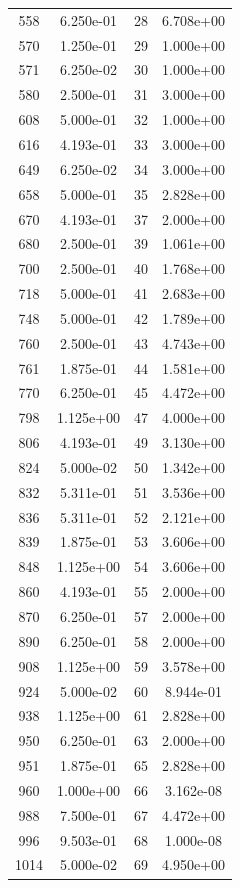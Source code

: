 \documentclass[12pt]{article}
\begin{document}
\begin{longtable}{@{}cccc@{}}
558 & 6.250e-01 & 28 & 6.708e+00 \\
570 & 1.250e-01 & 29 & 1.000e+00 \\
571 & 6.250e-02 & 30 & 1.000e+00 \\
580 & 2.500e-01 & 31 & 3.000e+00 \\
608 & 5.000e-01 & 32 & 1.000e+00 \\
616 & 4.193e-01 & 33 & 3.000e+00 \\
649 & 6.250e-02 & 34 & 3.000e+00 \\
658 & 5.000e-01 & 35 & 2.828e+00 \\
670 & 4.193e-01 & 37 & 2.000e+00 \\
680 & 2.500e-01 & 39 & 1.061e+00 \\
700 & 2.500e-01 & 40 & 1.768e+00 \\
718 & 5.000e-01 & 41 & 2.683e+00 \\
748 & 5.000e-01 & 42 & 1.789e+00 \\
760 & 2.500e-01 & 43 & 4.743e+00 \\
761 & 1.875e-01 & 44 & 1.581e+00 \\
770 & 6.250e-01 & 45 & 4.472e+00 \\
798 & 1.125e+00 & 47 & 4.000e+00 \\
806 & 4.193e-01 & 49 & 3.130e+00 \\
824 & 5.000e-02 & 50 & 1.342e+00 \\
832 & 5.311e-01 & 51 & 3.536e+00 \\
836 & 5.311e-01 & 52 & 2.121e+00 \\
839 & 1.875e-01 & 53 & 3.606e+00 \\
848 & 1.125e+00 & 54 & 3.606e+00 \\
860 & 4.193e-01 & 55 & 2.000e+00 \\
870 & 6.250e-01 & 57 & 2.000e+00 \\
890 & 6.250e-01 & 58 & 2.000e+00 \\
908 & 1.125e+00 & 59 & 3.578e+00 \\
924 & 5.000e-02 & 60 & 8.944e-01 \\
938 & 1.125e+00 & 61 & 2.828e+00 \\
950 & 6.250e-01 & 63 & 2.000e+00 \\
951 & 1.875e-01 & 65 & 2.828e+00 \\
960 & 1.000e+00 & 66 & 3.162e-08 \\
988 & 7.500e-01 & 67 & 4.472e+00 \\
996 & 9.503e-01 & 68 & 1.000e-08 \\
1014 & 5.000e-02 & 69 & 4.950e+00 \\

\end{longtable}
\end{document}
